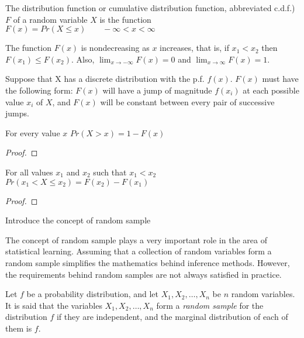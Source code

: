 \begin{definition}
The distribution function or cumulative distribution function, abbreviated c.d.f.) $F$ of a random variable $X$ is the function $F(x)=Pr(X\leq x)\qquad-\infty<x<\infty$
\end{definition}

{\color{red}
The function $F\left(x\right)$ is nondecreasing as $x$ increases, that is, if $x_{1}<x_{2}$ then $F\left(x_{1}\right)\leq F\left(x_{2}\right)$. Also, $\lim_{x\rightarrow-\infty}F\left(x\right)=0$ and $\lim_{x\rightarrow\infty}F\left(x\right)=1$.
}

{\color{red}
Suppose that X has a discrete distribution with the p.f. $f\left(x\right)$. $F\left(x\right)$ must have the following form: $F\left(x\right)$ will have a jump of magnitude $f\left(x_{i}\right)$ at each possible value $x_{i}$ of $X$, and $F\left(x\right)$ will be constant between every pair of successive jumps.
}

\begin{proposition}
For every value $x$ $Pr\left(X>x\right)=1-F\left(x\right)$
\end{proposition}
\begin{proof}
\end{proof}

\begin{proposition}
For all values $x_{1}$ and $x_{2}$ such that $x_{\text{1}}<x_{2}$ $Pr\left(x_{1}<X\leq x_{2}\right)=F\left(x_{2}\right)-F\left(x_{1}\right)$
\end{proposition}
 \begin{proof}
\end{proof}

{\color{red} Introduce the concept of random sample}

The concept of random sample plays a very important role in the area of statistical learning. Assuming that a collection of random variables form a random sample simplifies the mathematics behind inference methods. However, the requirements behind random samples are not always satisfied in practice.

\begin{definition}
Let $f$ be a probability distribution, and let $X_1, X_2, \ldots, X_n$ be $n$ random variables. It is said that the variables $X_1, X_2, \ldots, X_n$ form a \emph{random sample} for the distribution $f$ if they are independent, and the marginal distribution of each of them is $f$. 
\end{definition}


